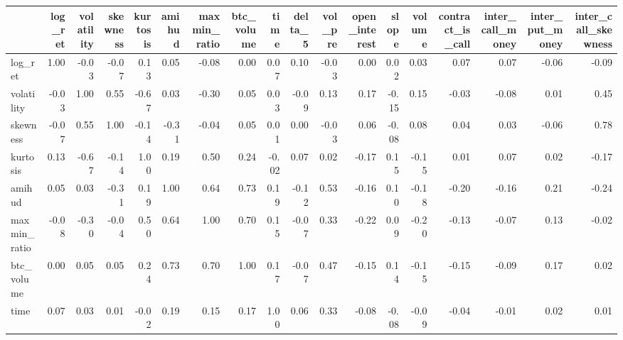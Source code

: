 \begin{tabular}{lrrrrrrrrrrrrrrrrr}
\toprule
{} &  log\_ret &  volatility &  skewness &  kurtosis &  amihud &  maxmin\_ratio &  btc\_volume &  time &  delta\_5 &  vol\_pre &  open\_interest &  slope &  volume &  contract\_is\_call &  inter\_call\_money &  inter\_put\_money &  inter\_call\_skewness \\
\midrule
log\_ret             &     1.00 &       -0.03 &     -0.07 &      0.13 &    0.05 &         -0.08 &        0.00 &  0.07 &     0.10 &    -0.03 &           0.00 &   0.02 &    0.03 &              0.07 &              0.07 &            -0.06 &                -0.09 \\
volatility          &    -0.03 &        1.00 &      0.55 &     -0.67 &    0.03 &         -0.30 &        0.05 &  0.03 &    -0.09 &     0.13 &           0.17 &  -0.15 &    0.15 &             -0.03 &             -0.08 &             0.01 &                 0.45 \\
skewness            &    -0.07 &        0.55 &      1.00 &     -0.14 &   -0.31 &         -0.04 &        0.05 &  0.01 &     0.00 &    -0.03 &           0.06 &  -0.08 &    0.08 &              0.04 &              0.03 &            -0.06 &                 0.78 \\
kurtosis            &     0.13 &       -0.67 &     -0.14 &      1.00 &    0.19 &          0.50 &        0.24 & -0.02 &     0.07 &     0.02 &          -0.17 &   0.15 &   -0.15 &              0.01 &              0.07 &             0.02 &                -0.17 \\
amihud              &     0.05 &        0.03 &     -0.31 &      0.19 &    1.00 &          0.64 &        0.73 &  0.19 &    -0.12 &     0.53 &          -0.16 &   0.10 &   -0.18 &             -0.20 &             -0.16 &             0.21 &                -0.24 \\
maxmin\_ratio        &    -0.08 &       -0.30 &     -0.04 &      0.50 &    0.64 &          1.00 &        0.70 &  0.15 &    -0.07 &     0.33 &          -0.22 &   0.09 &   -0.20 &             -0.13 &             -0.07 &             0.13 &                -0.02 \\
btc\_volume          &     0.00 &        0.05 &      0.05 &      0.24 &    0.73 &          0.70 &        1.00 &  0.17 &    -0.07 &     0.47 &          -0.15 &   0.14 &   -0.15 &             -0.15 &             -0.09 &             0.17 &                 0.02 \\
time                &     0.07 &        0.03 &      0.01 &     -0.02 &    0.19 &          0.15 &        0.17 &  1.00 &     0.06 &     0.33 &          -0.08 &  -0.08 &   -0.09 &             -0.04 &             -0.01 &             0.02 &                 0.01 \\

\end{tabular}
